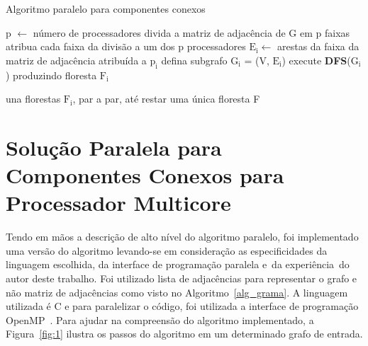 \documentclass[12pt]{article}
\begin{document}
\begin{algorithm}[H]
    \DontPrintSemicolon
    \newcommand\mycommfont[1]{\small\ttfamily{#1}}
    \caption{Algoritmo paralelo para componentes conexos}
    \label{alg_grama}
    {
        p $\gets$ número de processadores\;
        divida a matriz de adjacência de G em p faixas\;
        atribua cada faixa da divisão a um dos p processadores\;
        {
            $\text{E}_\text{i} \gets$ arestas da faixa da matriz de adjacência atribuída a $\text{p}_\text{i}$\;
            defina subgrafo $\text{G}_\text{i}$ = (V, $\text{E}_\text{i}$)\;
            execute \textbf{DFS}($\text{G}_\text{i}$) produzindo floresta $\text{F}_\text{i}$\;
        }

        una florestas $\text{F}_\text{i}$, par a par, até restar uma única floresta F\;
        
    }
\end{algorithm}

\section{Solução Paralela para Componentes Conexos para Processador Multicore}
Tendo em mãos a descrição de alto nível do algoritmo paralelo, foi implementado uma versão do algoritmo levando-se em consideração as especificidades da linguagem escolhida, da interface de programação paralela e da experiência do autor deste trabalho. Foi utilizado lista de adjacências para representar o grafo e não matriz de adjacências como visto no Algoritmo~\ref{alg_grama}. A linguagem utilizada é C e para paralelizar o código, foi utilizada a interface de programação OpenMP~\cite{OpenMP:2018}. Para ajudar na compreensão do algoritmo implementado, a Figura~\ref{fig:1} ilustra os passos do algoritmo em um determinado grafo de entrada.
\end{document}
